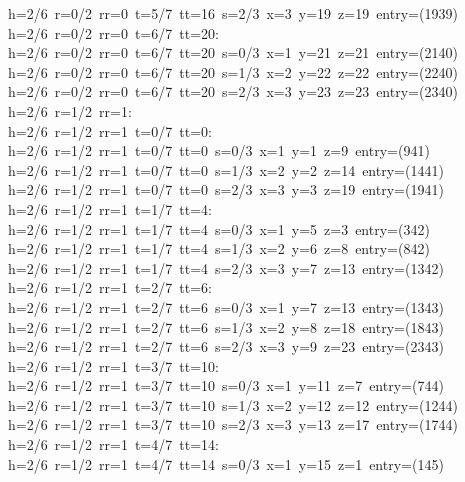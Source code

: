 \begin{tabbing}
h=2/6\ r=0/2\ rr=0\ t=5/7\ tt=16\ s=2/3\ x=3\ y=19\ z=19\ entry=(1939)\\[0pt]
h=2/6\ r=0/2\ rr=0\ t=6/7\ tt=20:\\[0pt]
h=2/6\ r=0/2\ rr=0\ t=6/7\ tt=20\ s=0/3\ x=1\ y=21\ z=21\ entry=(2140)\\[0pt]
h=2/6\ r=0/2\ rr=0\ t=6/7\ tt=20\ s=1/3\ x=2\ y=22\ z=22\ entry=(2240)\\[0pt]
h=2/6\ r=0/2\ rr=0\ t=6/7\ tt=20\ s=2/3\ x=3\ y=23\ z=23\ entry=(2340)\\[0pt]
h=2/6\ r=1/2\ rr=1:\\[0pt]
h=2/6\ r=1/2\ rr=1\ t=0/7\ tt=0:\\[0pt]
h=2/6\ r=1/2\ rr=1\ t=0/7\ tt=0\ s=0/3\ x=1\ y=1\ z=9\ entry=(941)\\[0pt]
h=2/6\ r=1/2\ rr=1\ t=0/7\ tt=0\ s=1/3\ x=2\ y=2\ z=14\ entry=(1441)\\[0pt]
h=2/6\ r=1/2\ rr=1\ t=0/7\ tt=0\ s=2/3\ x=3\ y=3\ z=19\ entry=(1941)\\[0pt]
h=2/6\ r=1/2\ rr=1\ t=1/7\ tt=4:\\[0pt]
h=2/6\ r=1/2\ rr=1\ t=1/7\ tt=4\ s=0/3\ x=1\ y=5\ z=3\ entry=(342)\\[0pt]
h=2/6\ r=1/2\ rr=1\ t=1/7\ tt=4\ s=1/3\ x=2\ y=6\ z=8\ entry=(842)\\[0pt]
h=2/6\ r=1/2\ rr=1\ t=1/7\ tt=4\ s=2/3\ x=3\ y=7\ z=13\ entry=(1342)\\[0pt]
h=2/6\ r=1/2\ rr=1\ t=2/7\ tt=6:\\[0pt]
h=2/6\ r=1/2\ rr=1\ t=2/7\ tt=6\ s=0/3\ x=1\ y=7\ z=13\ entry=(1343)\\[0pt]
h=2/6\ r=1/2\ rr=1\ t=2/7\ tt=6\ s=1/3\ x=2\ y=8\ z=18\ entry=(1843)\\[0pt]
h=2/6\ r=1/2\ rr=1\ t=2/7\ tt=6\ s=2/3\ x=3\ y=9\ z=23\ entry=(2343)\\[0pt]
h=2/6\ r=1/2\ rr=1\ t=3/7\ tt=10:\\[0pt]
h=2/6\ r=1/2\ rr=1\ t=3/7\ tt=10\ s=0/3\ x=1\ y=11\ z=7\ entry=(744)\\[0pt]
h=2/6\ r=1/2\ rr=1\ t=3/7\ tt=10\ s=1/3\ x=2\ y=12\ z=12\ entry=(1244)\\[0pt]
h=2/6\ r=1/2\ rr=1\ t=3/7\ tt=10\ s=2/3\ x=3\ y=13\ z=17\ entry=(1744)\\[0pt]
h=2/6\ r=1/2\ rr=1\ t=4/7\ tt=14:\\[0pt]
h=2/6\ r=1/2\ rr=1\ t=4/7\ tt=14\ s=0/3\ x=1\ y=15\ z=1\ entry=(145)\\[0pt]

\end{tabbing}
